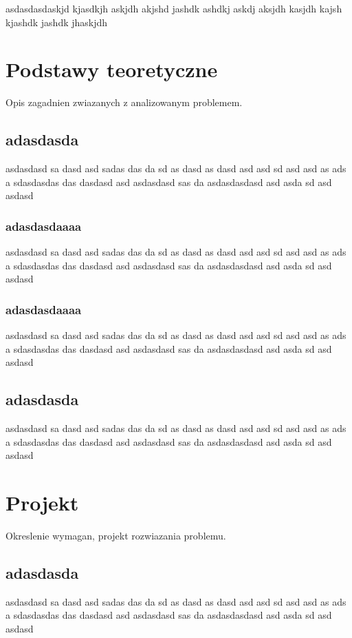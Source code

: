 \documentclass[14pt]{article}
\begin{document}
asdasdasdaskjd kjasdkjh askjdh akjshd jashdk ashdkj askdj aksjdh kasjdh kajsh kjashdk jashdk jhaskjdh


\section{Podstawy teoretyczne}
Opis zagadnien zwiazanych z analizowanym problemem.

\subsection{adasdasda}
asdasdasd sa dasd asd sadas das da sd as dasd as dasd asd asd sd asd asd as ads a sdasdasdas das dasdasd asd asdasdasd sas da asdasdasdasd asd asda sd asd asdasd

\subsubsection{adasdasdaaaa}
asdasdasd sa dasd asd sadas das da sd as dasd as dasd asd asd sd asd asd as ads a sdasdasdas das dasdasd asd asdasdasd sas da asdasdasdasd asd asda sd asd asdasd

\subsubsection{adasdasdaaaa}
asdasdasd sa dasd asd sadas das da sd as dasd as dasd asd asd sd asd asd as ads a sdasdasdas das dasdasd asd asdasdasd sas da asdasdasdasd asd asda sd asd asdasd

\subsection{adasdasda}
asdasdasd sa dasd asd sadas das da sd as dasd as dasd asd asd sd asd asd as ads a sdasdasdas das dasdasd asd asdasdasd sas da asdasdasdasd asd asda sd asd asdasd

\section{Projekt}
 Okreslenie wymagan, projekt rozwiazania problemu.
 
 \subsection{adasdasda}
asdasdasd sa dasd asd sadas das da sd as dasd as dasd asd asd sd asd asd as ads a sdasdasdas das dasdasd asd asdasdasd sas da asdasdasdasd asd asda sd asd asdasd
\end{document}
